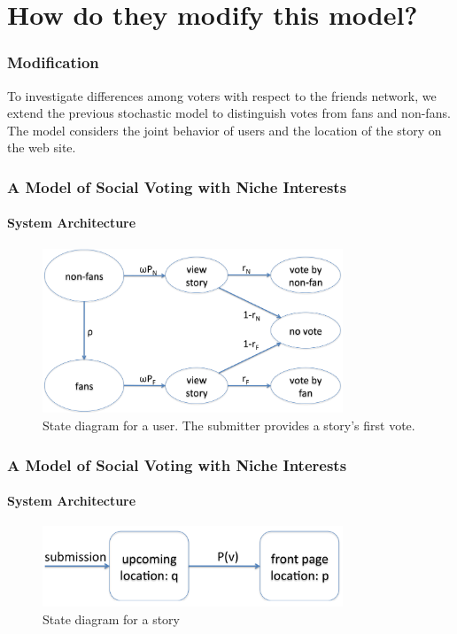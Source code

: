 \documentclass[aspectratio=43]{beamer}
\begin{document}
\section[Modify]{How do they modify this model?}
\begin{frame}
\frametitle{Modification}
\begin{minipage}{\textwidth}
\begin{exampleblock}{}
To investigate differences among voters with respect to the friends network, we extend the previous stochastic model to distinguish votes from fans and non-fans. The model considers the joint behavior of users and the location of the story on
the web site.
\end{exampleblock}
\end{minipage}
\end{frame}
\begin{frame}
\frametitle{A Model of Social Voting with Niche Interests}
\framesubtitle{System Architecture}
\centering
\begin{minipage}{\textwidth}
\begin{figure}
\centering
\includegraphics[width=0.8\textwidth]{fig05.png}
\caption{State diagram for a user. The submitter provides a story's first vote.}
\end{figure}
\end{minipage}
\end{frame}

\begin{frame}
\frametitle{A Model of Social Voting with Niche Interests}
\framesubtitle{System Architecture}
\centering
\begin{minipage}{\textwidth}
\begin{figure}
\centering
\includegraphics[width=0.8\textwidth]{fig12.PNG}
\caption{State diagram for a story}
\end{figure}
\end{minipage}
\end{frame}
\end{document}
